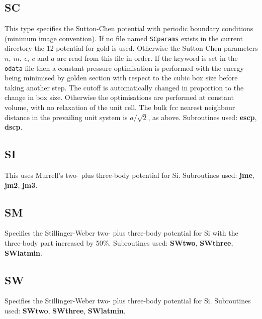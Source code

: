 {{{\subsection{SC}This type specifies the Sutton-Chen potential\cite{suttonc90} with periodic boundary
conditions (minimum image convention\cite{allent87}). 
If no file named {\tt SCparams} exists in the current 
directory the 12 potential for gold is used. Otherwise the Sutton-Chen
parameters $n,\ m,\ \epsilon,\ c$ and $a$ are read from this file in order. If the
keyword {} is set in the {\tt odata} file
then a constant pressure optimisation is performed
with the energy being minimised by golden section with respect to the cubic box size before taking another
step. The cutoff is automatically changed in proportion to the change in box size.
Otherwise the optimisations are performed at constant volume, with no relaxation of the
unit cell. The bulk fcc nearest neighbour distance in the prevailing unit system is $a/\sqrt{2}$,
as above.
Subroutines used: {\bf escp}, {\bf dscp}.

\subsection{SI}This uses Murrell's two- plus three-body potential for Si\cite{lijm92}.
Subroutines used: {\bf jme}, {\bf jm2}, {\bf jm3}.

\subsection{SM} Specifies the Stillinger-Weber two- plus three-body potential for Si\cite{stillingerw85}
with the three-body part increased by 50\%.
Subroutines used: {\bf SWtwo}, {\bf SWthree}, {\bf SWlatmin}.

\subsection{SW} Specifies the Stillinger-Weber two- plus three-body potential for Si\cite{stillingerw85}.
Subroutines used: {\bf SWtwo}, {\bf SWthree}, {\bf SWlatmin}.

}}}
